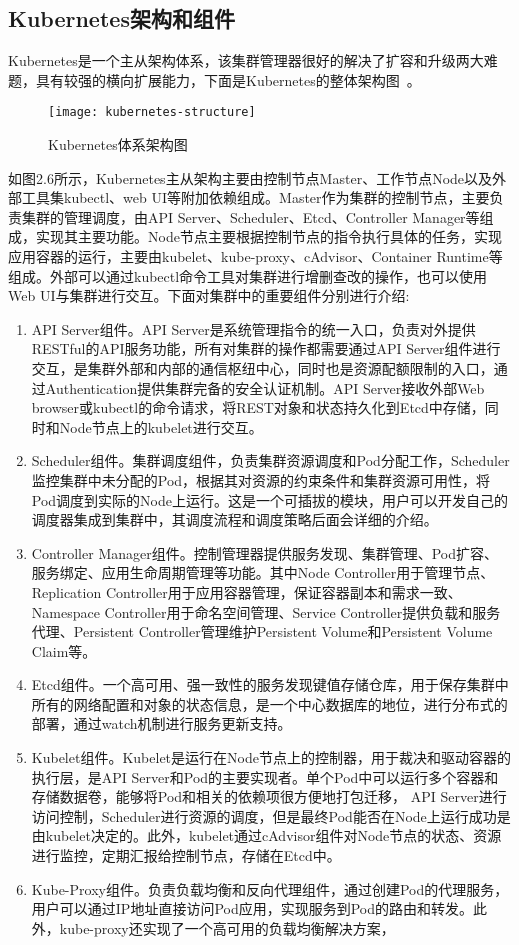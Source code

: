 \subsection{Kubernetes架构和组件}
Kubernetes是一个主从架构体系，该集群管理器很好的解决了扩容和升级两大难题，具有较强的横向扩展能力，下面是Kubernetes的整体架构图~\cite{KUBdoc}。
\begin{figure}[H] %
	\centering
	\texttt{[image: kubernetes-structure]}
	\caption{Kubernetes体系架构图}
\end{figure}
如图2.6所示，Kubernetes主从架构主要由控制节点Master、工作节点Node以及外部工具集kubectl、web UI等附加依赖组成。Master作为集群的控制节点，主要负责集群的管理调度，由API Server、Scheduler、Etcd、Controller Manager等组成，实现其主要功能。Node节点主要根据控制节点的指令执行具体的任务，实现应用容器的运行，主要由kubelet、kube-proxy、cAdvisor、Container Runtime等组成。外部可以通过kubectl命令工具对集群进行增删查改的操作，也可以使用Web UI与集群进行交互。下面对集群中的重要组件分别进行介绍:
\begin{enumerate}[1.]
	\item  API Server组件。API Server是系统管理指令的统一入口，负责对外提供RESTful的API服务功能，所有对集群的操作都需要通过API Server组件进行交互，是集群外部和内部的通信枢纽中心，同时也是资源配额限制的入口，通过Authentication提供集群完备的安全认证机制。API Server接收外部Web browser或kubectl的命令请求，将REST对象和状态持久化到Etcd中存储，同时和Node节点上的kubelet进行交互。
	\item Scheduler组件。集群调度组件，负责集群资源调度和Pod分配工作，Scheduler监控集群中未分配的Pod，根据其对资源的约束条件和集群资源可用性，将Pod调度到实际的Node上运行。这是一个可插拔的模块，用户可以开发自己的调度器集成到集群中，其调度流程和调度策略后面会详细的介绍。
	\item Controller Manager组件。控制管理器提供服务发现、集群管理、Pod扩容、服务绑定、应用生命周期管理等功能。其中Node Controller用于管理节点、Replication Controller用于应用容器管理，保证容器副本和需求一致、Namespace Controller用于命名空间管理、Service Controller提供负载和服务代理、Persistent Controller管理维护Persistent Volume和Persistent Volume Claim等。
	\item Etcd组件。一个高可用、强一致性的服务发现键值存储仓库，用于保存集群中所有的网络配置和对象的状态信息，是一个中心数据库的地位，进行分布式的部署，通过watch机制进行服务更新支持。
	\item Kubelet组件。Kubelet是运行在Node节点上的控制器，用于裁决和驱动容器的执行层，是API Server和Pod的主要实现者。单个Pod中可以运行多个容器和存储数据卷，能够将Pod和相关的依赖项很方便地打包迁移，	API Server进行访问控制，Scheduler进行资源的调度，但是最终Pod能否在Node上运行成功是由kubelet决定的。此外，kubelet通过cAdvisor组件对Node节点的状态、资源进行监控，定期汇报给控制节点，存储在Etcd中。
	\item Kube-Proxy组件。负责负载均衡和反向代理组件，通过创建Pod的代理服务，用户可以通过IP地址直接访问Pod应用，实现服务到Pod的路由和转发。此外，kube-proxy还实现了一个高可用的负载均衡解决方案，
\end{enumerate}

